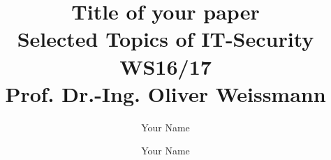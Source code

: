 \documentclass[runningheads,a4paper]{llncs}
\begin{document}


\title{Title of your paper \\
\vspace{\baselineskip}
\small{Selected Topics of IT-Security WS16/17} \\
Prof. Dr.-Ing. Oliver Weissmann
}

\author{Your Name}

%
\iffalse
\author{Your Name}%
\end{document}
